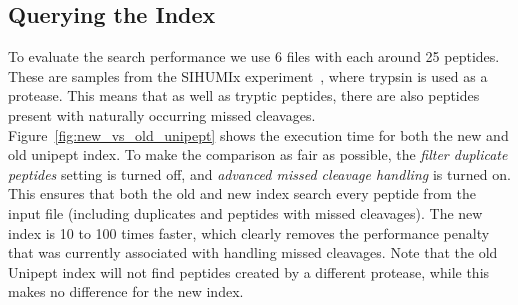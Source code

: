 \documentclass[11pt]{article}
\newenvironment{Figure}
{\par\medskip\noindent\minipage{\linewidth}}
{\endminipage\par\medskip}
\begin{document}
\begin{multicols}{2}
        \subsection{Querying the Index} %
        To evaluate the search performance we use 6 files with each around 25 peptides.
        These are samples from the SIHUMIx experiment~\cite{SIHUMI_frequently_used, SIHUMI_first_introduction}, where trypsin is used as a protease.
        This means that as well as tryptic peptides, there are also peptides present with naturally occurring missed cleavages.
        Figure~\ref{fig:new_vs_old_unipept} shows the execution time for both the new and old unipept index.
        To make the comparison as fair as possible, the \textit{filter duplicate peptides} setting is turned off, and \textit{advanced missed cleavage handling} is turned on.
        This ensures that both the old and new index search every peptide from the input file (including duplicates and peptides with missed cleavages).
        The new index is 10 to 100 times faster, which clearly removes the performance penalty that was currently associated with handling missed cleavages.
        Note that the old Unipept index will not find peptides created by a different protease, while this makes no difference for the new index.
        \begin{Figure}
            \centering
            \resizebox{\textwidth}{!}{
}
\end{Figure}
\end{multicols}
\end{document}
